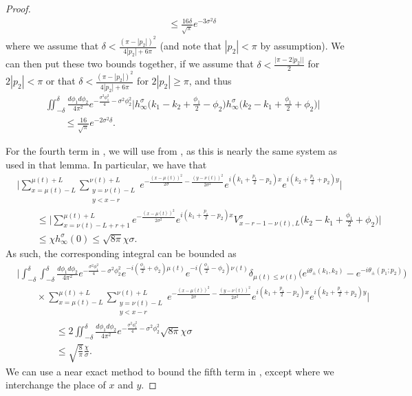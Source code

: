 \documentclass[../thesis-main/thesis-main]{subfiles}
\begin{document}
\begin{proof}
\begin{align}
    &\qquad \leq \frac{ 16 \delta}{\sqrt{\pi}} e^{ - 3 \sigma^2 \delta}
\end{align}
where we assume that $\delta < \frac{ (\pi - |p_2|)^2}{4|p_2| + 6\pi}$ (and note that $|p_2| < \pi$ by assumption).  We can then put these two bounds together, if we assume that $\delta < \frac{|\pi - 2|p_2||}{2}$ for $2|p_2| < \pi$ or that $\delta <  \frac{ (\pi - |p_2|)^2}{4|p_2| + 6\pi}$ for $2|p_2| \geq \pi$, and thus 
\begin{align}
    &\iint_{-\delta}^\delta \frac{d\phi_1d\phi_2}{4\pi^2} e^{ - \frac{\sigma^2\phi_1^2}{4} - \sigma^2 \phi_2^2}\bigg| h_\infty^\sigma \Big(k_1 -k_2 +\frac{\phi_1}{2} - \phi_2\Big) h_\infty^\sigma \Big(k_2 - k_1 + \frac{\phi_1}{2} + \phi_2\Big)\bigg|\nonumber\\
& \qquad \leq \frac{16 }{\sqrt{\pi}} e^{ - 2 \sigma^2 \delta}.
\end{align}


For the fourth term in , we will use  from , as this is nearly the same system as used in that lemma.  In particular, we have that
\begin{align}
  &\Bigg|\sum_{x=\mu(t)-L}^{\mu(t)+L} \sum_{\substack{y=\nu(t)-L\\y< x-r}}^{\nu(t)+L} e^{-\frac{(x-\mu(t))^2}{2\sigma} - \frac{(y-\nu(t))^2}{2\sigma^2}} e^{i (k_1 + \frac{p_1}{2} - p_2)x}e^{i(k_2 + \frac{p_1}{2} + p_2)y}\Bigg|\nonumber\\
  &\qquad \leq \Bigg|\sum_{x=\nu(t)-L+r+1}^{\mu(t)+L} e^{-\frac{(x-\mu(t))^2}{2\sigma^2}} e^{i (k_1 + \frac{p_1}{2} - p_2)x} V_{x-r-1 - \nu(t),L}^\sigma\big(k_2 - k_1 + \frac{\phi_1}{2} + \phi_2 \big) \Bigg|\\
  &\qquad \leq \chi h_{\infty}^\sigma (0) \leq \sqrt{8\pi} \chi \sigma .
\end{align}
As such, the corresponding integral can be bounded as
\begin{align}
  &\Bigg| \int_{-\delta}^\delta \int_{-\delta}^{\delta} \frac{ d\phi_1 d\phi_2}{4\pi^2} e^{ - \frac{\sigma^2\phi_1^2}{4} - \sigma^2 \phi_2^2} e^{-i (\frac{\phi_1}{2} + \phi_2)\mu(t)}e^{-i(\frac{\phi_1}{2} - \phi_2)\nu(t)} \delta_{\mu(t)\leq \nu(t)} \big( e^{i\theta_{\pm}(k_1,k_2)} - e^{-i\theta_{\pm}(p_1;p_2)}\big)\nonumber\\
&\qquad\times \sum_{x=\mu(t)-L}^{\mu(t)+L} \sum_{\substack{y=\nu(t)-L\\y< x-r}}^{\nu(t)+L} e^{-\frac{(x-\mu(t))^2}{2\sigma} - \frac{(y-\nu(t))^2}{2\sigma^2}} e^{i (k_1 + \frac{p_1}{2} - p_2)x}e^{i(k_2 + \frac{p_1}{2} + p_2)y}\Bigg|\nonumber\\
&\qquad \qquad \leq 2 \iint_{-\delta}^\delta \frac{ d\phi_1 d\phi_2}{4\pi^2} e^{ - \frac{\sigma^2\phi_1^2}{4} - \sigma^2 \phi_2^2} \sqrt{8\pi} \chi \sigma\\
&\qquad\qquad \leq \sqrt{\frac{8}{\pi}} \frac{\chi }{\sigma}.
\end{align}
We can use a near exact method to bound the fifth term in , except where we interchange the place of $x$ and $y$.


\end{proof}
\end{document}
